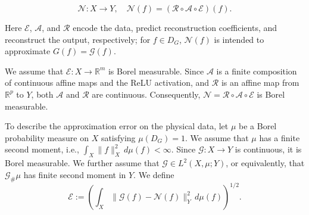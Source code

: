 \documentclass{article}
\numberwithin{equation}{section}
\theoremstyle{plain}
\begin{document}
	\begin{equation*}
		\mathscr{N}:X\to Y,\quad\mathscr{N}(f)=(\mathcal{R}\circ\mathcal{A}\circ\mathcal{E})(f).
	\end{equation*}
	
	Here $\mathcal E$, $\mathcal A$, and $\mathcal R$ encode the data, predict reconstruction coefficients, and reconstruct the output, respectively; for $f\in D_G$, $\mathscr N(f)$ is intended to approximate $G(f)=\mathscr G(f)$.
	
	We assume that $\mathcal E:X\to\mathbb R^m$ is Borel measurable. Since $\mathcal A$ is a finite composition of continuous affine maps and the ReLU activation, and $\mathcal R$ is an affine map from $\mathbb R^p$ to $Y$, both $\mathcal A$ and $\mathcal R$ are continuous. Consequently, $\mathscr N=\mathcal R\circ\mathcal A\circ\mathcal E$ is Borel measurable.
	
	To describe the approximation error on the physical data, let
	$\mu$ be a Borel probability measure on $X$ satisfying
	$\mu(D_G)=1$. We assume that $\mu$ has a finite second moment, i.e., $\int_X\|f\|_X^2\,d\mu(f)<\infty$.
	Since $\mathscr G:X\to Y$ is continuous, it is Borel measurable.
	We further assume that $\mathscr G\in L^2(X,\mu;Y)$, or equivalently,
	that $\mathscr G_\#\mu$ has finite second moment in $Y$. We define
	\begin{equation}
		\mathscr{E}:=
		\left(
		\int_X
		\|\mathscr{G}(f)-\mathscr{N}(f)\|_Y^2\,d\mu(f)
		\right)^{1/2}.
	\end{equation}
	
\end{document}
